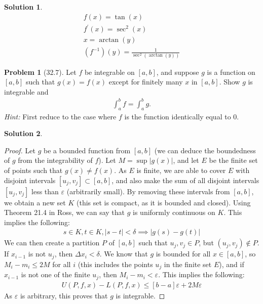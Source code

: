 \documentclass[12pt]{article}
\theoremstyle{definition} %
\newtheorem{solution}{Solution}
\newtheorem{problem}{Problem}
\theoremstyle{plain} %
\begin{document}
\begin{solution}
    \begin{align}
        f(x)=\tan(x) \\[10pt] 
        f^\prime (x)=\sec^{2}(x) \\[10pt] 
        x=\arctan(y) \\[10pt] 
        \left( f^{-1} \right) \left( y \right) =\frac{1}{\sec^{2}\left( \arctan(y) \right) }
    \end{align}
\end{solution}
\begin{problem}[32.7]
    Let $ f $ be integrable on $[a, b]$, and suppose $ g $ is a function on $[a, b]$ such that $ g(x) = f(x) $ except for finitely many $ x $ in $[a, b]$. Show $ g $ is integrable and
\begin{align}    
\int_a^b f = \int_a^b g.
\end{align}
\textit{Hint:} First reduce to the case where $ f $ is the function identically equal to 0.
\end{problem}
\begin{solution}
    \begin{proof} Let $g$ be a bounded function from $[a,b]$ (we can deduce the boundedness of $g$ from the integrability of $f$). Let $M=\sup\left\vert g(x) \right\vert $, and let $E$ be the finite set of points such that $g(x)\neq f(x)$. As $E$ is finite, we are able to cover $E$ with disjoint intervals $[u_j, v_j]\subset [a,b]$, and also make the sum of all disjoint intervals $[u_j, v_j]$ less than $\varepsilon$ (arbitrarily small). By removing these intervals from $[a,b]$, we obtain a new set $K$ (this set is compact, as it is bounded and closed). Using Theorem 21.4 in Ross, we can say that $g$ is uniformly continuous on $K$. This implies the following: 
        \begin{align}
           s \in K, t \in K, \left\vert s-t \right\vert < \delta \implies  \left\vert g(s)-g(t) \right\vert
        \end{align}
        We can then create a partition $P$ of $[a,b]$ such that $u_j, v_j \in P$, but $(u_j,v_j)\notin P$. If $x_{i-1}$ is not $u_j$, then $\Delta x_i < \delta$. We know that $g$ is bounded for all $x\in [a,b]$, so $M_{i}-m_i \leq 2M $ for all $i$ (this includes the points $u_j$ in the finite set $E$), and if $x_{i-1}$ is not one of the finite $u_j$, then $M_{i}-m_i <\varepsilon$. This implies the following:
        \begin{align}
            U(P,f,x)-L(P,f,x)\leq [b-a]\varepsilon + 2M\varepsilon
        \end{align}   
        As $\varepsilon$ is arbitrary, this proves that $g$ is integrable.  
    \end{proof}
\end{solution}
\end{document}
